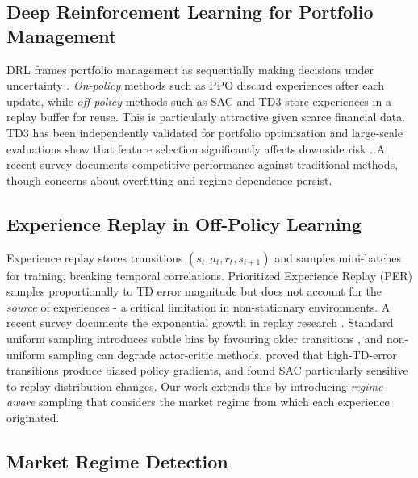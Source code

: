 \documentclass[11pt,a4paper]{article}
\begin{document}
\subsection{Deep Reinforcement Learning for Portfolio Management}

DRL frames portfolio management as sequentially making decisions under uncertainty \citep{mnih2015dqn, hoque2025review}. \textit{On-policy} methods such as PPO \citep{schulman2017ppo} discard experiences after each update, while \textit{off-policy} methods such as SAC \citep{haarnoja2018sac} and TD3 \citep{fujimoto2018td3} store experiences in a replay buffer for reuse. This is particularly attractive given scarce financial data. TD3 has been independently validated for portfolio optimisation \citep{jiang2024td3portfolio} and large-scale evaluations show that feature selection significantly affects downside risk \citep{ayari2025feature}. A recent survey \citep{drl_survey2024} documents competitive performance against traditional methods, though concerns about overfitting and regime-dependence persist.

\subsection{Experience Replay in Off-Policy Learning}

Experience replay \citep{mnih2015dqn} stores transitions $(s_t, a_t, r_t, s_{t+1})$ and samples mini-batches for training, breaking temporal correlations. Prioritized Experience Replay (PER) \citep{schaul2016per} samples proportionally to TD error magnitude but does not account for the \textit{source} of experiences - a critical limitation in non-stationary environments. A recent survey documents the exponential growth in replay research \citep{neves2025er_survey}. Standard uniform sampling introduces subtle bias by favouring older transitions \citep{yenicesu2024cuer}, and non-uniform sampling can degrade actor-critic methods. \citet{saglam2023actor} proved that high-TD-error transitions produce biased policy gradients, and \citet{wang2019ere} found SAC particularly sensitive to replay distribution changes. Our work extends this by introducing \textit{regime-aware} sampling that considers the market regime from which each experience originated.

\subsection{Market Regime Detection}
\end{document}
